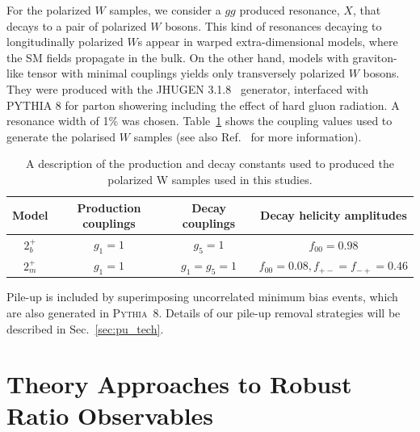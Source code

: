 \documentclass[11pt,letterpaper]{article}
\newcommand{\pythia}{\textsc{Pythia~8}\xspace}
\DeclareRobustCommand{\Sec}[1]{Sec.~\ref{#1}}
\DeclareRobustCommand{\Ref}[1]{Ref.~\cite{#1}}
\begin{document}
For the polarized $W$ samples, we consider a $gg$ produced resonance, $X$, that decays to a pair of polarized $W$ bosons.
%
This kind of resonances decaying to longitudinally polarized $W$s appear in warped extra-dimensional models, where the SM fields propagate in the bulk.
%
On the other hand, models with graviton-like tensor with minimal couplings yields only transversely polarized $W$ bosons.
%
They were produced with the \textsc{JHUGEN} 3.1.8~\cite{Gao:2010qx,Bolognesi:2012mm} generator, interfaced with \textsc{PYTHIA} 8 \cite{Sjostrand:2007gs} for parton showering including the effect of hard gluon radiation.
%
%
A resonance width of 1\% was chosen.
%
Table~\ref{table:polarisedSamples} shows the coupling values used to generate the polarised $W$ samples (see also \Ref{Gao:2010qx} for more information). 

\begin{table}[ht]
\centering
\begin{tabular}{|c|c|c|c|}
\hline
Model	&Production couplings	&Decay couplings	&Decay helicity amplitudes 	\\
\hline
$2_b^+$	& $g_1=1$		& $g_5=1$		& $f_{00}=0.98$			\\
$2_m^+$	& $g_1=1$		& $g_1=g_5=1$		& $f_{00}=0.08,f_{+-}=f_{-+}=0.46$\\	
\hline
\end{tabular}
\caption{A description of the production and decay constants used to produced the polarized W samples used in this studies.}
\label{table:polarisedSamples}
\end{table}

Pile-up is included by superimposing uncorrelated minimum bias events, which are also generated in \pythia. Details of our pile-up removal strategies will be described in \Sec{sec:pu_tech}.





\section{Theory Approaches to Robust Ratio Observables}\label{sec:hybrid_ratio}
\end{document}

